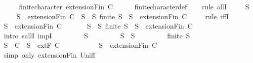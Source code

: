 \begin{isabellebody}
%
\isadelimproof
%
\endisadelimproof
%
\isatagproof
{}\isamarkupfalse%
\ {\isacharminus}\isanewline
\ \ \isamarkupfalse%
\ {\isachardoublequoteopen}finite{\isacharunderscore}character\ {\isacharparenleft}extensionFin\ C{\isacharparenright}{\isachardoublequoteclose}\isanewline
\ \ \ \ \isamarkupfalse%
\ finite{\isacharunderscore}character{\isacharunderscore}def\isanewline
\ \ \isamarkupfalse%
\ {\isacharparenleft}rule\ allI{\isacharparenright}\isanewline
\ \ \ \isamarkupfalse%
\ S\isanewline
\ \ \ \isamarkupfalse%
\ {\isachardoublequoteopen}S\ {\isasymin}\ {\isacharparenleft}extensionFin\ C{\isacharparenright}\ {\isasymlongleftrightarrow}\ {\isacharparenleft}{\isasymforall}S{\isacharprime}\ {\isasymsubseteq}\ S{\isachardot}\ finite\ S{\isacharprime}\ {\isasymlongrightarrow}\ S{\isacharprime}\ {\isasymin}\ {\isacharparenleft}extensionFin\ C{\isacharparenright}{\isacharparenright}{\isachardoublequoteclose}\isanewline
\ \ \ \isamarkupfalse%
\ {\isacharparenleft}rule\ iffI{\isacharparenright}\isanewline
\ \ \ \ \ \isamarkupfalse%
\ {\isachardoublequoteopen}S\ {\isasymin}\ {\isacharparenleft}extensionFin\ C{\isacharparenright}{\isachardoublequoteclose}\isanewline
\ \ \ \ \ \isamarkupfalse%
\ {\isachardoublequoteopen}{\isasymforall}S{\isacharprime}\ {\isasymsubseteq}\ S{\isachardot}\ finite\ S{\isacharprime}\ {\isasymlongrightarrow}\ S{\isacharprime}\ {\isasymin}\ {\isacharparenleft}extensionFin\ C{\isacharparenright}{\isachardoublequoteclose}\isanewline
\ \ \ \ \ \isamarkupfalse%
\ {\isacharparenleft}intro\ sallI\ impI{\isacharparenright}\isanewline
\ \ \ \ \ \ \ \isamarkupfalse%
\ S{\isacharprime}\isanewline
\ \ \ \ \ \ \ \isamarkupfalse%
\ {\isachardoublequoteopen}S{\isacharprime}\ {\isasymsubseteq}\ S{\isachardoublequoteclose}\isanewline
\ \ \ \ \ \ \ \isamarkupfalse%
\ {\isachardoublequoteopen}finite\ S{\isacharprime}{\isachardoublequoteclose}\isanewline
\ \ \ \ \ \ \ \isamarkupfalse%
\ {\isachardoublequoteopen}S\ {\isasymin}\ C\ {\isasymor}\ S\ {\isasymin}\ {\isacharparenleft}extF\ C{\isacharparenright}{\isachardoublequoteclose}\isanewline
\ \ \ \ \ \ \ \ \ \isamarkupfalse%
\ {\isacartoucheopen}S\ {\isasymin}\ {\isacharparenleft}extensionFin\ C{\isacharparenright}{\isacartoucheclose}\ \isamarkupfalse%
\ {\isacharparenleft}simp\ only{\isacharcolon}\ extensionFin\ Un{\isacharunderscore}iff{\isacharparenright}\isanewline

\end{isabellebody}
